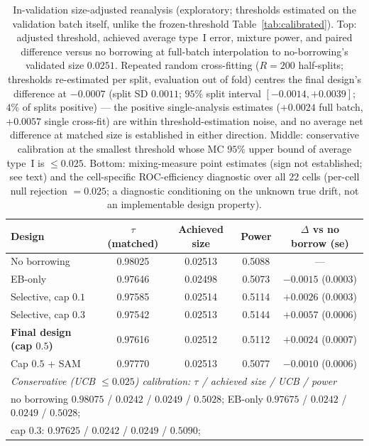 \documentclass[11pt]{article}
\begin{document}
\begin{table}[htbp]
\centering
\small
\setlength{\tabcolsep}{4pt}
\caption{In-validation size-adjusted reanalysis (exploratory; thresholds
estimated on the validation batch itself, unlike the frozen-threshold
Table~\ref{tab:calibrated}). Top: adjusted threshold, achieved average
type~I error, mixture power, and paired difference versus no borrowing at
full-batch interpolation to no-borrowing's validated size $0.0251$.
Repeated random cross-fitting ($R = 200$ half-splits; thresholds
re-estimated per split, evaluation out of fold) centres the final
design's difference at $-0.0007$ (split SD $0.0011$; $95\%$ split
interval $[-0.0014, +0.0039]$; $4\%$ of splits positive) --- the positive
single-analysis estimates ($+0.0024$ full batch, $+0.0057$ single
cross-fit) are within threshold-estimation noise, and no average net
difference at matched size is established in either direction. Middle:
conservative
calibration at the smallest threshold whose MC $95\%$ upper bound of
average type~I is $\le 0.025$. Bottom: mixing-measure point estimates
(sign not established; see text) and the cell-specific ROC-efficiency
diagnostic over all $22$ cells (per-cell null rejection $= 0.025$; a
diagnostic conditioning on the unknown true drift, not an implementable
design property).}
\label{tab:sizematched}
\begin{tabular}{lcccc}
\hline
Design & $\tau$ (matched) & Achieved size & Power & $\Delta$ vs no borrow
(se) \\
\hline
No borrowing & 0.98025 & 0.02513 & 0.5088 & --- \\
EB-only & 0.97646 & 0.02498 & 0.5073 & $-0.0015$ (0.0003) \\
Selective, cap $0.1$ & 0.97585 & 0.02514 & 0.5114 & $+0.0026$ (0.0003) \\
Selective, cap $0.3$ & 0.97542 & 0.02513 & 0.5144 & $+0.0057$ (0.0006) \\
\textbf{Final design (cap $0.5$)} & 0.97616 & 0.02512 & 0.5112 &
$+0.0024$ (0.0007) \\
Cap $0.5$ + SAM & 0.97770 & 0.02513 & 0.5077 & $-0.0010$ (0.0006) \\
\hline
\multicolumn{5}{l}{\emph{Conservative (UCB $\le 0.025$) calibration:
$\tau$ / achieved size / UCB / power}}\\
\multicolumn{5}{l}{no borrowing $0.98075$ / $0.0242$ / $0.0249$ /
$0.5028$; \quad EB-only $0.97675$ / $0.0242$ / $0.0249$ / $0.5028$;}\\
\multicolumn{5}{l}{cap $0.3$: $0.97625$ / $0.0242$ / $0.0249$ / $0.5090$;
}
\end{tabular}
\end{table}
\end{document}
